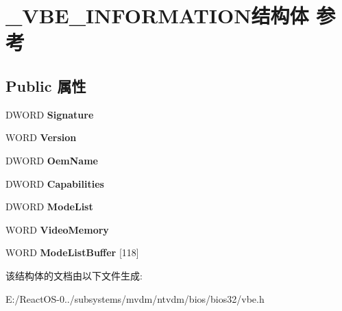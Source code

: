 \hypertarget{struct___v_b_e___i_n_f_o_r_m_a_t_i_o_n}{}\section{\+\_\+\+V\+B\+E\+\_\+\+I\+N\+F\+O\+R\+M\+A\+T\+I\+O\+N结构体 参考}
\label{struct___v_b_e___i_n_f_o_r_m_a_t_i_o_n}
\subsection*{Public 属性}
\begin{DoxyCompactItemize}
\item 
\mbox{\label{struct___v_b_e___i_n_f_o_r_m_a_t_i_o_n_a58881fe7df5ee4f136d584e1a0d250d4}} 
D\+W\+O\+RD {\bfseries Signature}
\item 
\mbox{\label{struct___v_b_e___i_n_f_o_r_m_a_t_i_o_n_a1773cf8a0a847452643041512be60a67}} 
W\+O\+RD {\bfseries Version}
\item 
\mbox{\label{struct___v_b_e___i_n_f_o_r_m_a_t_i_o_n_a835857dfdac224e4c8e0dc683e403ca0}} 
D\+W\+O\+RD {\bfseries Oem\+Name}
\item 
\mbox{\label{struct___v_b_e___i_n_f_o_r_m_a_t_i_o_n_adda8a72879ec92c8b96068eabffc1b46}} 
D\+W\+O\+RD {\bfseries Capabilities}
\item 
\mbox{\label{struct___v_b_e___i_n_f_o_r_m_a_t_i_o_n_ae4d0fe9f605054fe20c241927d2c809d}} 
D\+W\+O\+RD {\bfseries Mode\+List}
\item 
\mbox{\label{struct___v_b_e___i_n_f_o_r_m_a_t_i_o_n_a3149d3b4eb77594d3f32eacbfeca7d42}} 
W\+O\+RD {\bfseries Video\+Memory}
\item 
\mbox{\label{struct___v_b_e___i_n_f_o_r_m_a_t_i_o_n_a1127144941f4812337479dd31fabf837}} 
W\+O\+RD {\bfseries Mode\+List\+Buffer} \mbox{[}118\mbox{]}
\end{DoxyCompactItemize}


该结构体的文档由以下文件生成\+:\begin{DoxyCompactItemize}
\item 
E\+:/\+React\+O\+S-\/0../subsystems/mvdm/ntvdm/bios/bios32/vbe.\+h\end{DoxyCompactItemize}
